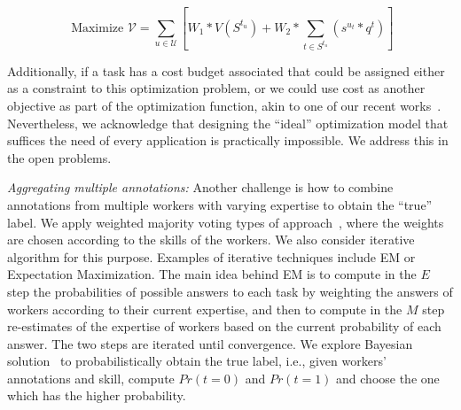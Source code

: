 
\begin{equation}\label{eqn:eq2}
 \text{ Maximize } \mathcal{V} =  \sum_{u \in \mathcal{U}} [W_1 * V(S^{t_u}) +  W_2 * \sum_{t \in S^{t_u}} (s^{u_t}*q^t)]
\end{equation}

Additionally, if a task has a cost budget associated that could be assigned either as a constraint to this optimization problem, or we could use cost as another objective as part of the optimization function, akin to one of our recent works~\cite{roy2015task}. Nevertheless, we acknowledge that designing the ``ideal'' optimization model that suffices the need of every application is practically impossible. We address this in the open problems.

{\em  Aggregating multiple annotations:} Another challenge is how to combine annotations from multiple workers with varying expertise to obtain the ``true'' label. We apply weighted majority voting types of approach~\cite{ho2013adaptive}, where the weights are chosen according to the skills of the workers. We also consider iterative algorithm for this purpose. Examples of iterative techniques include EM or Expectation Maximization\cite{hung2013evaluation}. The main idea behind EM is to compute in the $E$ step the probabilities of possible answers to each task by weighting the answers of workers according to their current expertise, and then to compute in the $M$ step re-estimates of the expertise of workers based on the current probability of each answer. The two steps are iterated until convergence.  We explore Bayesian solution~\cite{clemen2007aggregating} to probabilistically obtain the true label, i.e., given workers' annotations and skill, compute $Pr(t=0)$ and $Pr(t=1)$ and choose the one which has the higher probability.

\vspace{-0.1in}

